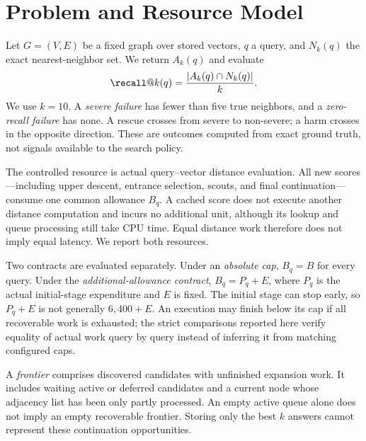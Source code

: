 \section{Problem and Resource Model}\label{sec:problem}
Let $G=(V,E)$ be a fixed graph over stored vectors, $q$ a query, and $N_k(q)$ the exact nearest-neighbor set. We return $A_k(q)$ and evaluate
\[
 \recall@k(q)=\frac{|A_k(q)\cap N_k(q)|}{k}.
\]
We use $k=10$. A \emph{severe failure} has fewer than five true neighbors, and a \emph{zero-recall failure} has none. A rescue crosses from severe to non-severe; a harm crosses in the opposite direction. These are outcomes computed from exact ground truth, not signals available to the search policy.

The controlled resource is actual query--vector distance evaluation. All new scores---including upper descent, entrance selection, scouts, and final continuation---consume one common allowance $B_q$. A cached score does not execute another distance computation and incurs no additional unit, although its lookup and queue processing still take CPU time. Equal distance work therefore does not imply equal latency. We report both resources.

Two contracts are evaluated separately. Under an \emph{absolute cap}, $B_q=B$ for every query. Under the \emph{additional-allowance contract}, $B_q=P_q+E$, where $P_q$ is the actual initial-stage expenditure and $E$ is fixed. The initial stage can stop early, so $P_q+E$ is not generally $6{,}400+E$. An execution may finish below its cap if all recoverable work is exhausted; the strict comparisons reported here verify equality of actual work query by query instead of inferring it from matching configured caps.

A \emph{frontier} comprises discovered candidates with unfinished expansion work. It includes waiting active or deferred candidates and a current node whose adjacency list has been only partly processed. An empty active queue alone does not imply an empty recoverable frontier. Storing only the best $k$ answers cannot represent these continuation opportunities.
